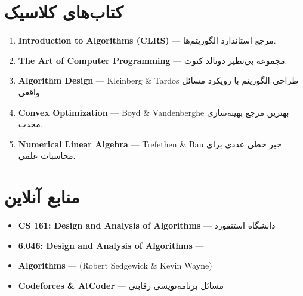 \documentclass{matinbook}
\begin{document}
    \section{کتاب‌های کلاسیک}
    
    \begin{enumerate}
        \item \textbf{Introduction to Algorithms (CLRS)} ---
        \cite{cormen2009}
        مرجع استاندارد الگوریتم‌ها.
        
        \item \textbf{The Art of Computer Programming} ---
        \cite{knuth1984}
        مجموعه بی‌نظیر دونالد کنوث.
        
        \item \textbf{Algorithm Design} ---
        Kleinberg \& Tardos
        طراحی الگوریتم با رویکرد مسائل واقعی.
        
        \item \textbf{Convex Optimization} ---
        Boyd \& Vandenberghe
        بهترین مرجع بهینه‌سازی محدب.
        
        \item \textbf{Numerical Linear Algebra} ---
        Trefethen \& Bau
        جبر خطی عددی برای محاسبات علمی.
    \end{enumerate}
    
    \section{منابع آنلاین}
    
    \begin{itemize}
        \item \textbf{CS 161: Design and Analysis of Algorithms}
        --- دانشگاه استنفورد
        
        \item \textbf{6.046: Design and Analysis of Algorithms}
        --- 
        
        \item \textbf{Algorithms} --- 
        (Robert Sedgewick \& Kevin Wayne)
        
        \item \textbf{Codeforces \& AtCoder}
        --- مسائل برنامه‌نویسی رقابتی
    \end{itemize}
    
    
    \begin{latin}
        \printbibliography[title={منابع و مراجع}]
    \end{latin}
    
    \printindex
    
\end{document}
